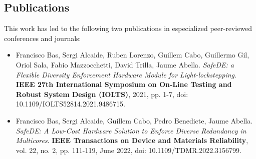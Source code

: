 \subsection{Publications}

This work has led to the following two publications in especialized peer-reviewed conferences and journals:

\begin{itemize}
\item 
Francisco Bas, Sergi Alcaide, Ruben Lorenzo, Guillem Cabo, Guillermo Gil, Oriol Sala, Fabio Mazzocchetti, David Trilla, Jaume Abella.
\emph{SafeDE: a Flexible Diversity Enforcement Hardware Module for Light-lockstepping}. 
\textbf{IEEE 27th International Symposium on On-Line Testing and Robust System Design (IOLTS)}, 2021, pp. 1-7, doi: 10.1109/IOLTS52814.2021.9486715.

\item
Francisco Bas, Sergi Alcaide, Guillem Cabo, Pedro Benedicte, Jaume Abella.
\emph{SafeDE: A Low-Cost Hardware Solution to Enforce Diverse Redundancy in Multicores}.
\textbf{IEEE Transactions on Device and Materials Reliability}, vol. 22, no. 2, pp. 111-119, June 2022, doi: 10.1109/TDMR.2022.3156799.
\end{itemize}

